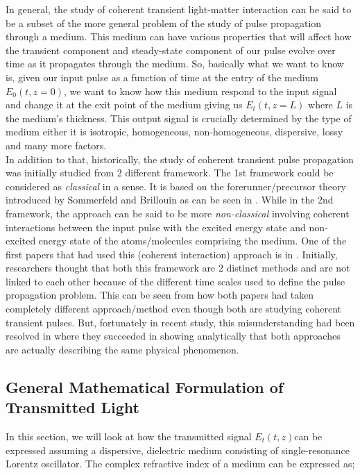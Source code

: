 In general, the study of coherent transient light-matter interaction can be said to be a subset of the more general problem of the study of pulse propagation through a medium. This medium can have various properties that will affect how the transient component and steady-state component of our pulse evolve over time as it propagates through the medium. So, basically what we want to know is, given our input pulse as a function of time at the entry of the medium $E_{0}(t, z = 0)$, we want to know how this medium respond to the input signal and change it at the exit point of the medium giving us $E_{t}(t, z = L)$ where $L$ is the medium's thickness. This output signal is crucially determined by the type of medium either it is isotropic, homogeneous, non-homogeneous, dispersive, lossy and many more factors.\\

In addition to that, historically, the study of coherent transient pulse propagation was initially studied from 2 different framework. The 1st framework could be considered as \textit{classical} in a sense. It is based on the forerunner/precursor theory introduced by Sommerfeld and Brillouin as can be seen in \cite{Sommerfeld1914, Brillouin1914}. While in the 2nd framework, the approach can be said to be more \textit{non-classical} involving coherent interactions between the input pulse with the excited energy state and non-excited energy state of the atoms/molecules comprising the medium. One of the first papers that had used this (coherent interaction) approach is in \cite{Crisp1970}. Initially, researchers thought that both this framework are 2 distinct methods and are not linked to each other because of the different time scales used to  define the pulse propagation problem. This can be seen from how both papers \cite{Segard_1987, Crisp1970} had taken completely different approach/method even though both are studying coherent transient pulses. But, fortunately in recent study, this misunderstanding had been resolved in \cite{Jeong2008} where they succeeded in showing analytically that both approaches are actually describing the same physical phenomenon.

\subsection{General Mathematical Formulation of Transmitted Light}\label{general}
In this section, we will look at how the transmitted signal $E_{t}(t, z)$can be expressed assuming a dispersive, dielectric medium consisting of single-resonance Lorentz oscillator. The complex refractive index of a medium can be expressed as;

